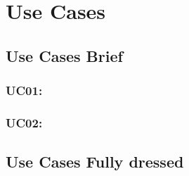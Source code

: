 \section{Use Cases}

\subsection{Use Cases Brief}
\subsubsection{UC01: }


\subsubsection{UC02: }

\subsection{Use Cases Fully dressed}
